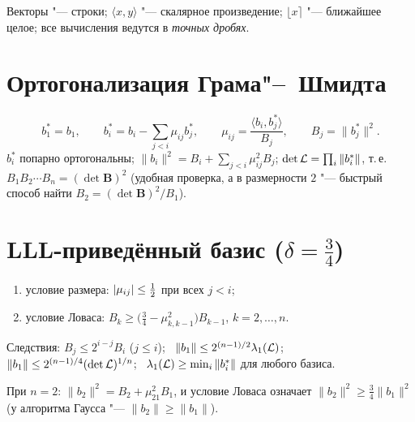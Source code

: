 \documentclass{ca-handout}
\begin{document}
\makehandouttitle

Векторы "--- строки; $\langle x, y\rangle$ "--- скалярное произведение; $\lfloor x \rceil$ "---
ближайшее целое; все вычисления ведутся в \emph{точных дробях}.

\section{Ортогонализация Грама"--~Шмидта}
\begin{reminder}[title={Формулы}]
\[
  b_1^* = b_1, \qquad b_i^* = b_i - \sum_{j<i} \mu_{ij} b_j^*, \qquad
  \mu_{ij} = \frac{\langle b_i, b_j^*\rangle}{B_j}, \qquad B_j = \|b_j^*\|^2 .
\]
$b_i^*$ попарно ортогональны; $\|b_i\|^2 = B_i + \sum_{j<i} \mu_{ij}^2 B_j$;
\quad $\det \mathcal{L} = \prod_i \|b_i^*\|$, т.\,е. $B_1 B_2 \cdots B_n = (\det \mathbf{B})^2$
(удобная проверка, а в размерности $2$ "--- быстрый способ найти $B_2 = (\det\mathbf B)^2/B_1$).
\end{reminder}

\section{LLL-приведённый базис ($\delta = \frac34$)}
\begin{reminder}[title={Определение и свойства}]
\begin{enumerate}
  \item условие размера: $\lvert\mu_{ij}\rvert \le \frac12$ при всех $j < i$;
  \item условие Ловаса: $B_k \ge \bigl(\frac34 - \mu_{k,k-1}^2\bigr) B_{k-1}$, $k = 2, \dots, n$.
\end{enumerate}
Следствия: $B_j \le 2^{i-j} B_i$ ($j \le i$); \ $\|b_1\| \le 2^{(n-1)/2} \lambda_1(\mathcal{L})$; \
$\|b_1\| \le 2^{(n-1)/4} (\det\mathcal{L})^{1/n}$; \ $\lambda_1(\mathcal{L}) \ge \min_i \|b_i^*\|$ для
любого базиса.
\end{reminder}
При $n = 2$: $\|b_2\|^2 = B_2 + \mu_{21}^2 B_1$, и условие Ловаса означает
$\|b_2\|^2 \ge \frac34 \|b_1\|^2$ (у алгоритма Гаусса "--- $\|b_2\| \ge \|b_1\|$).
\end{document}
